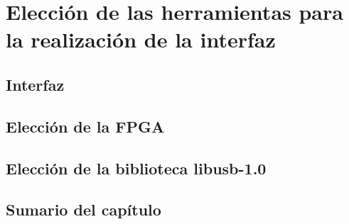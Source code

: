 \chapter{Elección de las herramientas para la realización de la interfaz}
	\label{cap:mats}
	
	\section{Interfaz}
			
	\section{Elección de la FPGA}
		\label{mats:fpga}
		
	\section{Elección de la biblioteca libusb-1.0}
		
	\section{Sumario del capítulo}
		
	
%		
%		
%		
		